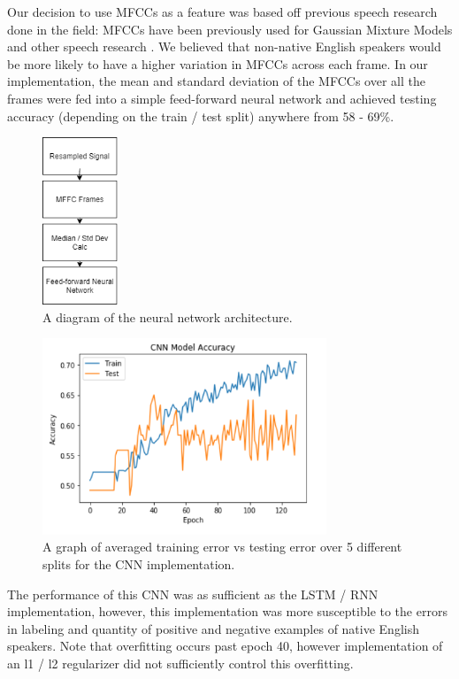 \documentclass{article}
\begin{document}
Our decision to use MFCCs as a feature was based off previous speech research done in the field: MFCCs have been previously used for Gaussian Mixture Models and other speech research \cite{mfccs, chuaccent}.
We believed that non-native English speakers would be more likely to have a higher variation in MFCCs across each frame.
In our implementation, the mean and standard deviation of the MFCCs over all the frames were fed into a simple feed-forward neural network and achieved testing accuracy (depending on the train / test split) anywhere from 58 - 69\%.

\begin{figure}[htb]
	\centering
	\includegraphics[width = 2.25cm]{figs/cnn_architecture}
	\caption{A diagram of the neural network architecture.}
	\label{fig:cnn_architecture}
\end{figure}

\begin{figure}[htb]
	\centering
	\includegraphics[width = 8.5cm]{figs/cnn_graph}
	\caption{A graph of averaged training error vs testing error over 5 different splits for the CNN implementation.}
	\label{fig:cnn_graph}
\end{figure}

The performance of this CNN was as sufficient as the LSTM / RNN implementation, however, this implementation was more susceptible to the errors in labeling and quantity of positive and negative examples of native English speakers.
Note that overfitting occurs past epoch 40, however implementation of an  l1 / l2 regularizer did not sufficiently control this overfitting.
\end{document}
